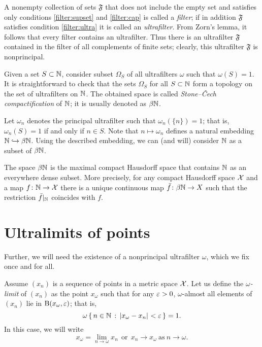A nonempty collection of sets $\mathfrak{F}$ that does not include the empty set and satisfies only conditions \ref{filter:supset} and \ref{filter:cap} is called a \emph{filter}; 
if in addition $\mathfrak{F}$ satisfies condition \ref{filter:ultra} it is called an \emph{ultrafilter}.
From Zorn's lemma, it follows that every filter contains an ultrafilter.
Thus there is an ultrafilter $\mathfrak{F}$ contained in the filter of all complements of finite sets; clearly, this ultrafilter $\mathfrak{F}$ is nonprincipal.


Given a set $S\subset \mathbb{N}$, consider subset $\Omega_S$ of all ultrafilters $\omega$ such that $\omega(S)=1$.
It is straightforward to check that the sets $\Omega_S$ for all $S\subset \mathbb{N}$ form a topology on the set of ultrafilters on $\mathbb{N}$. 
The obtained space is called \emph{Stone--\v{C}ech compactification} of $\mathbb{N}$;
it is usually denoted as $\beta\mathbb{N}$.

Let $\omega_n$ denotes the principal ultrafilter such that $\omega_n(\{n\})=1$; that is, $\omega_n(S)=1$ if and only if $n\in S$.
Note that $n\mapsto\omega_n$ defines a natural embedding $\mathbb{N}\hookrightarrow\beta\mathbb{N}$. 
Using the described embedding, we can (and will) consider $\mathbb{N}$ as a subset of $\beta\mathbb{N}$.

The space $\beta\mathbb{N}$ is the maximal compact Hausdorff space that contains $\mathbb{N}$  as an everywhere dense subset.
More precisely, for any compact Hausdorff space $\mathcal{X}$ 
and a map $f\colon\mathbb{N}\to \mathcal{X}$ there is a unique continuous map $\bar f\colon\beta\mathbb{N}\to X$ such that the restriction $\bar f|_{\mathbb{N}}$ coincides with $f$. 

\section{Ultralimits of points}
\label{ultralimits}

Further, we will need the existence of a nonprincipal  ultrafilter $\omega$,
which we fix once and for all.

Assume $(x_n)$ is a sequence of points in a metric space $\mathcal{X}$. 
Let us define the \emph{$\omega$-limit} of $(x_n)$ as the point $x_\omega$ 
such that for any $\varepsilon>0$, $\omega$-almost all elements of $(x_n)$ lie in $\mathrm{B}{}(x_\omega,\varepsilon)$; 
that is,
\[\omega\set{n\in\NN}{\dist{x_\omega}{x_n}{}<\eps}=1.\]
In this case, we will write 
\[x_\omega=\lim_{n\to\omega} x_n
\ \ \text{or}\ \ 
x_n\to x_\omega\ \text{as}\ n\to\omega.\]

